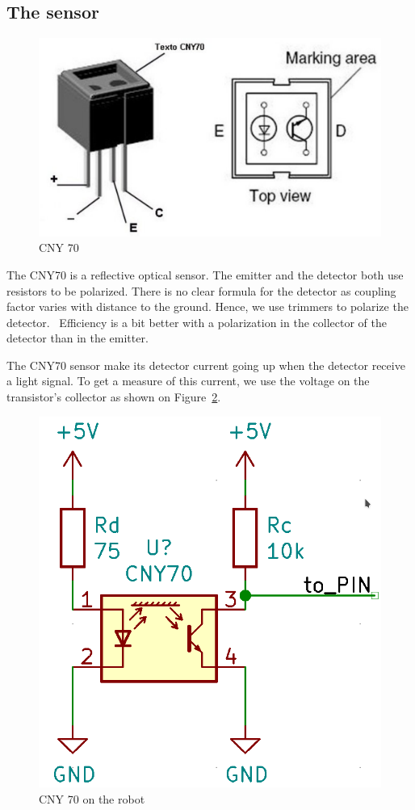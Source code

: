 \subsection{The sensor}

\begin{figure}[!ht]
 \centering
 \includegraphics[width=.5\textwidth]{images/cny70}
 \caption{CNY 70}
 \label{fig:cny70}
\end{figure}

The CNY70 is a reflective optical sensor.
The emitter and the detector both use resistors to be polarized.
There is no clear formula for the detector as coupling factor varies with distance to the ground. Hence, we use trimmers to polarize the detector. 
Efficiency is a bit better with a polarization in the collector of the detector than in the emitter.

The CNY70 sensor make its detector current going up when the detector receive a light signal. To get a measure of this current, we use the voltage on the transistor's collector as shown on Figure~\ref{fig:cny70}.

\begin{figure}[!ht]
 \centering
 \includegraphics[width=.5\textwidth]{images/montage_cny}
 \caption{CNY 70 on the robot}
 \label{fig:cny70}
\end{figure}


